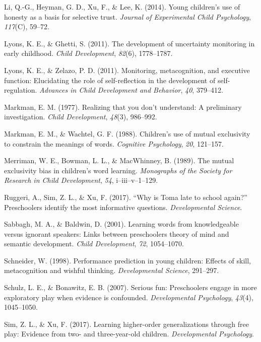 \documentclass[english,man]{apa6}
\theoremstyle{definition}
\theoremstyle{definition}
\theoremstyle{definition}
\theoremstyle{remark}
\begin{document}
\hypertarget{ref-Li2014}{}
Li, Q.-G., Heyman, G. D., Xu, F., \& Lee, K. (2014). Young children's
use of honesty as a basis for selective trust. \emph{Journal of
Experimental Child Psychology}, \emph{117}(C), 59--72.

\hypertarget{ref-Lyons2011a}{}
Lyons, K. E., \& Ghetti, S. (2011). The development of uncertainty
monitoring in early childhood. \emph{Child Development}, \emph{82}(6),
1778--1787.

\hypertarget{ref-Lyons2011}{}
Lyons, K. E., \& Zelazo, P. D. (2011). Monitoring, metacognition, and
executive function: Elucidating the role of self-reflection in the
development of self-regulation. \emph{Advances in Child Development and
Behavior}, \emph{40}, 379--412.

\hypertarget{ref-Markman1977}{}
Markman, E. M. (1977). Realizing that you don't understand: A
preliminary investigation. \emph{Child Development}, \emph{48}(3),
986--992.

\hypertarget{ref-Markman1988}{}
Markman, E. M., \& Wachtel, G. F. (1988). Children's use of mutual
exclusivity to constrain the meanings of words. \emph{Cognitive
Psychology}, \emph{20}, 121--157.

\hypertarget{ref-Merriman1989}{}
Merriman, W. E., Bowman, L. L., \& MacWhinney, B. (1989). The mutual
exclusivity bias in children's word learning. \emph{Monographs of the
Society for Research in Child Development}, \emph{54},
i--iii--v--1--129.

\hypertarget{ref-Ruggeri2017}{}
Ruggeri, A., Sim, Z. L., \& Xu, F. (2017). ``Why is Toma late to school
again?'' Preschoolers identify the most informative questions.
\emph{Developmental Science}.

\hypertarget{ref-Sabbagh2001}{}
Sabbagh, M. A., \& Baldwin, D. (2001). Learning words from knowledgeable
versus ignorant speakers: Links between preschoolers theory of mind and
semantic development. \emph{Child Development}, \emph{72}, 1054--1070.

\hypertarget{ref-Schneider1998}{}
Schneider, W. (1998). Performance prediction in young children: Effects
of skill, metacognition and wishful thinking. \emph{Developmental
Science}, 291--297.

\hypertarget{ref-Schulz2007}{}
Schulz, L. E., \& Bonawitz, E. B. (2007). Serious fun: Preschoolers
engage in more exploratory play when evidence is confounded.
\emph{Developmental Psychology}, \emph{43}(4), 1045--1050.

\hypertarget{ref-Sim2017}{}
Sim, Z. L., \& Xu, F. (2017). Learning higher-order generalizations
through free play: Evidence from two- and three-year-old children.
\emph{Developmental Psychology}.
\end{document}
